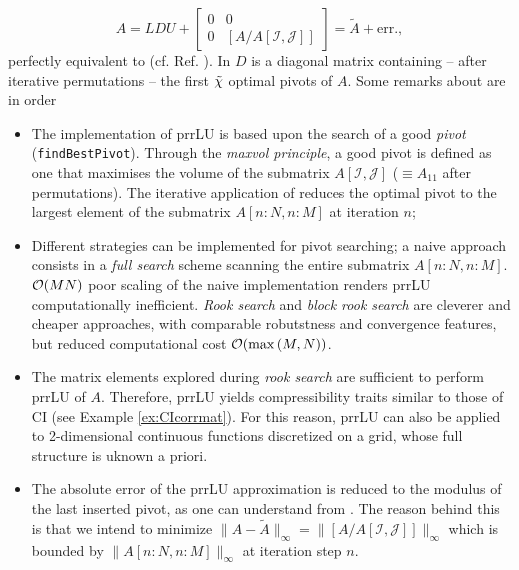 \begin{equation}
	A = LDU + \begin{bmatrix}
		0 & 0\\
		0 & [A/A[\mathcal{I}, \mathcal{J}]]
	\end{bmatrix} = \tilde{A} + \textrm{err.},
	\label{eq:prrLUCI}
\end{equation}
perfectly equivalent to  (cf. Ref. \cite{Fernandez2024}). In   $D$ is a diagonal matrix containing -- after iterative permutations -- the first ${\tilde \chi}$ optimal pivots of $A$.
Some remarks about  are in order
\begin{itemize}
	\item The implementation of prrLU is based upon the search of a good \textit{pivot} (\texttt{findBestPivot}). Through the \textit{maxvol principle}, a good pivot is defined as one that maximises the volume of the submatrix $A[\mathcal{I}, \mathcal{J}]$ ($\equiv A_{11}$ after permutations). The iterative application of  reduces the optimal pivot to the largest element of the submatrix $A[n\!:\!N,n\!:\!M]$ at iteration $n$;
	\item Different strategies can be implemented for pivot searching; a naive approach consists in a \textit{full search} scheme scanning the entire submatrix $A[n\!:\!N,n\!:\!M]$. $\mathcal{O}(MN)$ poor scaling of the naive implementation renders prrLU computationally inefficient. \textit{Rook search} \cite{Poole2000} and \textit{block rook search} \cite{Fernandez2024} are cleverer and cheaper approaches, with comparable robutstness and convergence features, but reduced computational cost $\mathcal{O}(\max\left(M,N\right))$.  
	\item The matrix elements explored during \textit{rook search} are sufficient to perform prrLU of $A$. Therefore, prrLU yields compressibility traits similar to those of CI (see Example \ref{ex:CIcorrmat}). For this reason, prrLU can also be applied to 2-dimensional continuous functions discretized on a grid, whose full structure is uknown a priori. 	
	\item The absolute error of the prrLU approximation is reduced to the modulus of the last inserted pivot, as one can understand from . The reason behind this is that we intend to minimize $\parallel\! A - \tilde{A}\!\parallel_{\infty} = \parallel\![A/A[\mathcal{I}, \mathcal{J}]] \!\parallel_{\infty}$ which is bounded by $\parallel\! A[n\!:\!N, n\!:\!M]\!\parallel_{\infty}$ at iteration step $n$.  
\end{itemize}


